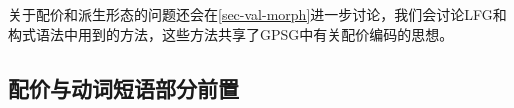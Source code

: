 关于配价和派生形态的问题还会在\ref{sec-val-morph}进一步讨论，我们会讨论LFG\indexlfgc 和构式语法\indexcxgc 中用到的方法，这些方法共享了GPSG中有关配价编码的思想。

\subsection{配价与动词短语部分前置}

